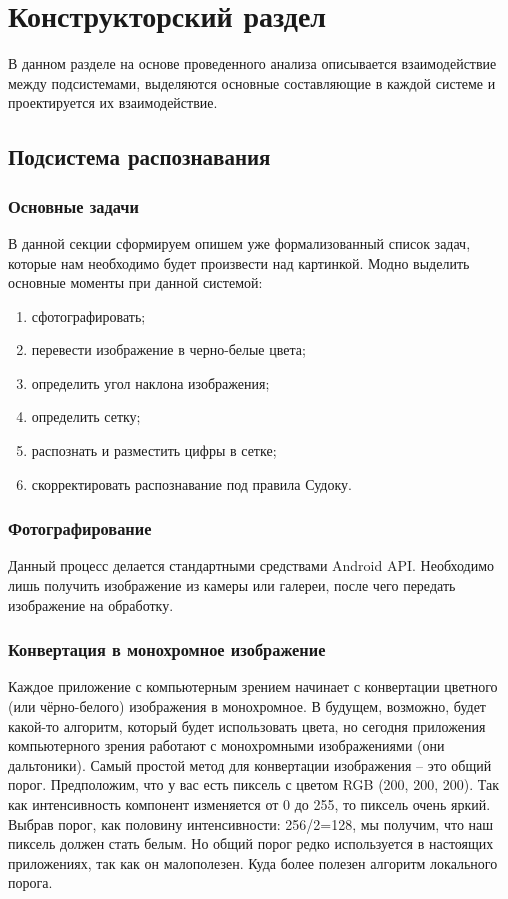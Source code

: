 \chapter{Конструкторский раздел}
\label{cha:design}

В данном разделе на основе проведенного анализа описывается взаимодействие между подсистемами, выделяются основные составляющие в каждой системе и проектируется их взаимодействие.



\section{Подсистема распознавания}
\subsection{Основные задачи}
В данной секции сформируем опишем уже формализованный список задач, которые нам необходимо будет произвести над картинкой.
Модно выделить основные моменты при данной системой:
\begin{enumerate}
  \item сфотографировать;
  \item перевести изображение в черно-белые цвета;
  \item определить угол наклона изображения;
  \item определить сетку;
  \item распознать и разместить цифры в сетке;
  \item скорректировать распознавание под правила Судоку.
\end{enumerate}

\subsection{Фотографирование}
Данный процесс делается стандартными средствами Android API. Необходимо лишь получить изображение из камеры или галереи, после чего передать изображение на обработку.

\subsection{Конвертация в монохромное изображение}
Каждое приложение с компьютерным зрением начинает с конвертации цветного (или чёрно-белого) изображения в монохромное. В будущем, возможно, будет какой-то алгоритм, который будет использовать цвета, но сегодня приложения компьютерного зрения работают с монохромными изображениями (они дальтоники).
Самый простой метод для конвертации изображения – это общий порог. Предположим, что у вас есть пиксель с цветом RGB (200, 200, 200). Так как интенсивность компонент изменяется от 0 до 255, то пиксель очень яркий. Выбрав порог, как половину интенсивности: 256/2=128, мы получим, что наш пиксель должен стать белым. Но общий порог редко используется в настоящих приложениях, так как он малополезен. Куда более полезен алгоритм локального порога.

